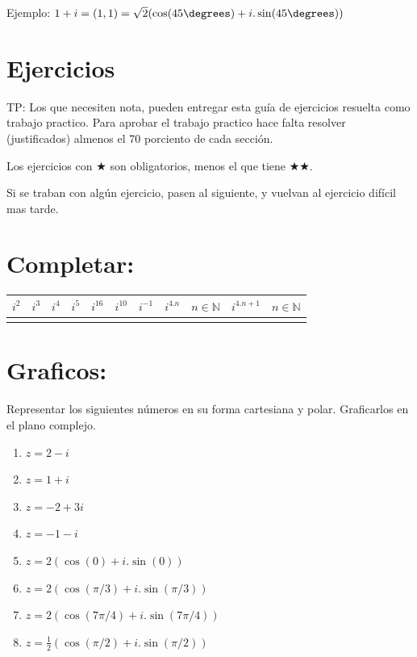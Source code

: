 \documentclass[a4paper,11pt,spanish,sans]{exam}
\newcommand{\Ts}{\rule{0pt}{2.6ex}}       %
\newcommand{\Bs}{\rule[-1.2ex]{0pt}{0pt}} %
\begin{document}
Ejemplo: $1+i=(1,1)=\sqrt{2}(\cos(45\degrees)+i.\sin(45\degrees))$

\section*{Ejercicios}

TP: Los que necesiten nota, pueden entregar esta guía de ejercicios resuelta como trabajo practico. Para aprobar el trabajo practico hace falta resolver (justificados) almenos el 70 porciento de cada sección. 

Los ejercicios con $\bigstar $ son obligatorios, menos el que tiene $\bigstar \bigstar$.

Si se traban con algún ejercicio, pasen al siguiente, y vuelvan al ejercicio difícil mas tarde.

\section{Completar:}
\begin{center}
	\label{completar}
	\begin{tabular}{|c|c|c|c|c|c|c|c|c|}
		\hline
		$i^2$  & $i^3$  &  $i^4$ &  $i^5$ &  $i^{16}$ & $i^{10}$ & $i^{-1}$  & $i^{4.n} \quad n\in \mathbb{N}$ & $i^{4.n+1} \quad n\in \mathbb{N}$  \Ts \Bs     \\ \hline
		 &  &  &  &  &  &  & &     \Ts \Bs     \\ \hline  
	\end{tabular}
\end{center}

\section{Graficos:}
Representar los siguientes números en su forma  cartesiana y  polar. Graficarlos en el plano complejo.
\begin{multicols}{2}
\begin{enumerate}%
\item $z=2-i$
\item $z=1+i$
\item $z=-2+3i$
\item $z=-1-i$

\columnbreak

\item $z=2(\cos(0)+i. \sin(0))$
\item $z=2(\cos(\pi /3)+i. \sin(\pi /3))$
\item $z=2(\cos(7\pi /4)+i. \sin(7\pi /4))$
\item $z=\frac{1}{2}(\cos(\pi /2)+i. \sin(\pi/2))$

\end{enumerate}
\end{multicols}
\end{document}
